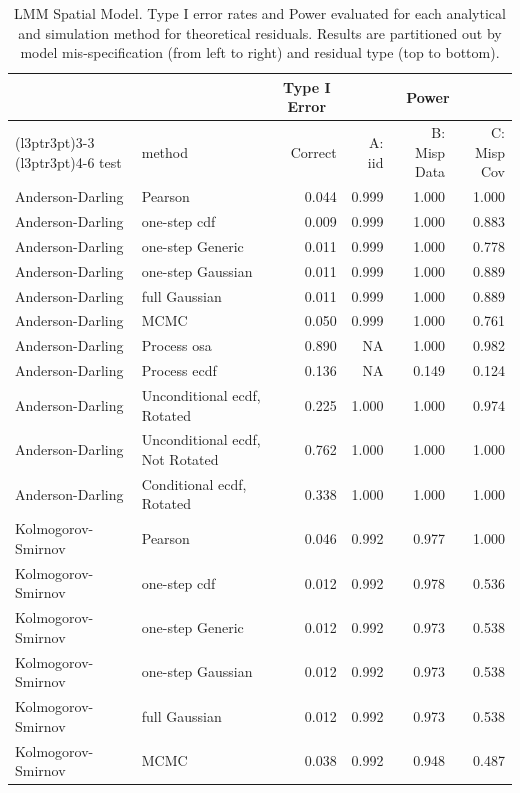 \documentclass[
]{article}
\begin{document}
\begin{table}[H]
\centering
\caption{\label{tab:spatial-results-lmm-theor}LMM Spatial Model. Type I error rates and Power evaluated for each analytical and simulation method for theoretical residuals. Results are partitioned out by model mis-specification (from left to right) and residual type (top to bottom).}
\centering
\begin{tabular}[t]{llrrrr}
\toprule
\multicolumn{1}{c}{ } & \multicolumn{1}{c}{ } & \multicolumn{1}{c}{Type I Error} & \multicolumn{3}{c}{Power} \\
\cmidrule(l{3pt}r{3pt}){3-3} \cmidrule(l{3pt}r{3pt}){4-6}
test & method & Correct & A: iid & B: Misp Data & C: Misp Cov\\
\midrule
Anderson-Darling & Pearson & 0.044 & 0.999 & 1.000 & 1.000\\
Anderson-Darling & one-step cdf & 0.009 & 0.999 & 1.000 & 0.883\\
Anderson-Darling & one-step Generic & 0.011 & 0.999 & 1.000 & 0.778\\
Anderson-Darling & one-step Gaussian & 0.011 & 0.999 & 1.000 & 0.889\\
Anderson-Darling & full Gaussian & 0.011 & 0.999 & 1.000 & 0.889\\
\addlinespace
Anderson-Darling & MCMC & 0.050 & 0.999 & 1.000 & 0.761\\
Anderson-Darling & Process osa & 0.890 & NA & 1.000 & 0.982\\
Anderson-Darling & Process ecdf & 0.136 & NA & 0.149 & 0.124\\
Anderson-Darling & Unconditional ecdf, Rotated & 0.225 & 1.000 & 1.000 & 0.974\\
Anderson-Darling & Unconditional ecdf, Not Rotated & 0.762 & 1.000 & 1.000 & 1.000\\
\addlinespace
Anderson-Darling & Conditional ecdf, Rotated & 0.338 & 1.000 & 1.000 & 1.000\\
Kolmogorov- Smirnov & Pearson & 0.046 & 0.992 & 0.977 & 1.000\\
Kolmogorov- Smirnov & one-step cdf & 0.012 & 0.992 & 0.978 & 0.536\\
Kolmogorov- Smirnov & one-step Generic & 0.012 & 0.992 & 0.973 & 0.538\\
Kolmogorov- Smirnov & one-step Gaussian & 0.012 & 0.992 & 0.973 & 0.538\\
\addlinespace
Kolmogorov- Smirnov & full Gaussian & 0.012 & 0.992 & 0.973 & 0.538\\
Kolmogorov- Smirnov & MCMC & 0.038 & 0.992 & 0.948 & 0.487\\

\end{tabular}
\end{table}
\end{document}
